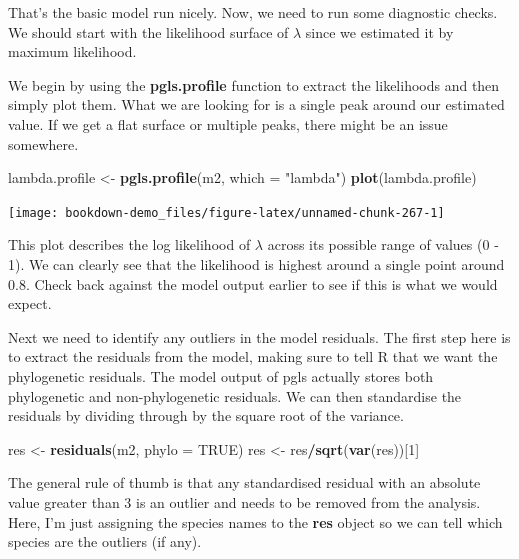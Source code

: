 \documentclass[
]{book}
\newenvironment{Shaded}{\begin{snugshade}}{\end{snugshade}}
\newcommand{\DataTypeTok}[1]{\textcolor[rgb]{0.13,0.29,0.53}{#1}}
\newcommand{\DecValTok}[1]{\textcolor[rgb]{0.00,0.00,0.81}{#1}}
\newcommand{\KeywordTok}[1]{\textcolor[rgb]{0.13,0.29,0.53}{\textbf{#1}}}
\newcommand{\NormalTok}[1]{#1}
\newcommand{\OperatorTok}[1]{\textcolor[rgb]{0.81,0.36,0.00}{\textbf{#1}}}
\newcommand{\OtherTok}[1]{\textcolor[rgb]{0.56,0.35,0.01}{#1}}
\newcommand{\StringTok}[1]{\textcolor[rgb]{0.31,0.60,0.02}{#1}}
\begin{document}
That's the basic model run nicely. Now, we need to run some diagnostic checks. We should start with the likelihood surface of \(\lambda\) since we estimated it by maximum likelihood.

We begin by using the \textbf{pgls.profile} function to extract the likelihoods and then simply plot them. What we are looking for is a single peak around our estimated value. If we get a flat surface or multiple peaks, there might be an issue somewhere.

\begin{Shaded}
\begin{Highlighting}[]
\NormalTok{lambda.profile \textless{}{-}}\StringTok{ }\KeywordTok{pgls.profile}\NormalTok{(m2, }\DataTypeTok{which =} \StringTok{"lambda"}\NormalTok{)}
\KeywordTok{plot}\NormalTok{(lambda.profile)}
\end{Highlighting}
\end{Shaded}

\begin{center}\texttt{[image: bookdown-demo\_files/figure-latex/unnamed-chunk-267-1]} \end{center}

This plot describes the log likelihood of \(\lambda\) across its possible range of values (0 - 1). We can clearly see that the likelihood is highest around a single point around 0.8. Check back against the model output earlier to see if this is what we would expect.

Next we need to identify any outliers in the model residuals. The first step here is to extract the residuals from the model, making sure to tell R that we want the phylogenetic residuals. The model output of pgls actually stores both phylogenetic and non-phylogenetic residuals. We can then standardise the residuals by dividing through by the square root of the variance.

\begin{Shaded}
\begin{Highlighting}[]
\NormalTok{res \textless{}{-}}\StringTok{ }\KeywordTok{residuals}\NormalTok{(m2, }\DataTypeTok{phylo =} \OtherTok{TRUE}\NormalTok{)}
\NormalTok{res \textless{}{-}}\StringTok{ }\NormalTok{res}\OperatorTok{/}\KeywordTok{sqrt}\NormalTok{(}\KeywordTok{var}\NormalTok{(res))[}\DecValTok{1}\NormalTok{]}
\end{Highlighting}
\end{Shaded}

The general rule of thumb is that any standardised residual with an absolute value greater than 3 is an outlier and needs to be removed from the analysis. Here, I'm just assigning the species names to the \textbf{res} object so we can tell which species are the outliers (if any).
\end{document}
